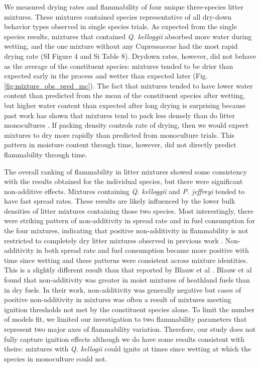 \documentclass[letterpaper,12pt]{article}
\begin{document}
We measured drying rates and flammability of four unique three-species litter
mixtures. These mixtures contained species representative of all dry-down
behavior types observed in single species trials. As expected from the single
species results, mixtures that contained \emph{Q. kelloggii} absorbed more
water during wetting, and the one mixture without any Cupressaceae had the most
rapid drying rate (SI Figure 4 and Si Table 8). Drydown rates, however, did not behave as the
average of the constituent species: mixtures tended to be drier than expected
early in the process and wetter than expected later (Fig.
\ref{fig:mixture_obs_pred_mc}). The fact that mixtures tended to have lower
water content than predicted from the mean of the constituent species after
wetting, but higher water content than expected after long drying is surprising
because past work has shown that mixtures tend to pack less densely than do
litter monocultures \citep[][, Table 2]{Magalhaes+Schwilk-2012}. If packing
density controls rate of drying, then we would expect mixtures to dry more
rapidly than predicted from monoculture trials. This pattern in moisture
content through time, however, did not directly predict flammability through
time.


The overall ranking of flammability in litter mixtures showed some consistency
with the results obtained for the individual species, but there were
significant non-additive effects. Mixtures containing \emph{Q. kelloggii} and
\emph{P. jeffreyi} tended to have fast spread rates. These results are likely
influenced by the lower bulk densities of litter mixtures containing those two
species. Most interestingly, there were striking pattern of non-additivity in
spread rate and in fuel consumption for the four mixtures, indicating that
positive non-additivity in flammability is not restricted to completely dry
litter mixtures observed in previous work \citep{Magalhaes+Schwilk-2012,
  VanAltena+Logtestjin+etal-2012}. Non-additivity in both spread rate and fuel
consumption became more positive with time since wetting and these patterns
were consistent across mixture identities. This is a slightly different result
than that reported by Blauw et al \citeyear{Blauw+Wensink+etal-2015}. Blauw et
al found that non-additivity was greater in moist mixtures of heathland fuels
than in dry fuels. In their work, non-additivity was generally negative but cases of 
positive non-additivity in mixtures was often a result of mixtures meeting
ignition thresholds not met by the constituent species alone. To limit the
number of models fit, we limited our investigation to two flammability
parameters that represent two major axes of flammability variation. Therefore,
our study does not fully capture ignition effects although we do have some
results consistent with theirs: mixtures with \emph{Q. kellogii} could ignite
at times since wetting at which the species in monoculture could not.
\end{document}
